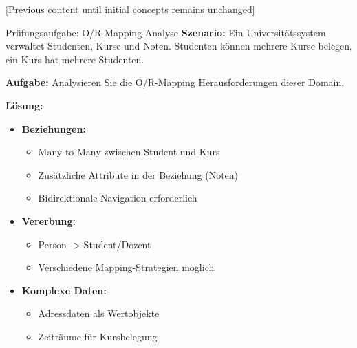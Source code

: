 [Previous content until initial concepts remains unchanged]

\begin{example}{Prüfungsaufgabe: O/R-Mapping Analyse}
\textbf{Szenario:}
Ein Universitätssystem verwaltet Studenten, Kurse und Noten. Studenten können mehrere 
Kurse belegen, ein Kurs hat mehrere Studenten.

\textbf{Aufgabe:} 
Analysieren Sie die O/R-Mapping Herausforderungen dieser Domain.

\textbf{Lösung:}
\begin{itemize}
    \item \textbf{Beziehungen:}
    \begin{itemize}
        \item Many-to-Many zwischen Student und Kurs
        \item Zusätzliche Attribute in der Beziehung (Noten)
        \item Bidirektionale Navigation erforderlich
    \end{itemize}
    
    \item \textbf{Vererbung:}
    \begin{itemize}
        \item Person -> Student/Dozent
        \item Verschiedene Mapping-Strategien möglich
    \end{itemize}
    
    \item \textbf{Komplexe Daten:}
    \begin{itemize}
        \item Adressdaten als Wertobjekte
        \item Zeiträume für Kursbelegung
    \end{itemize}
\end{itemize}
\end{example}

